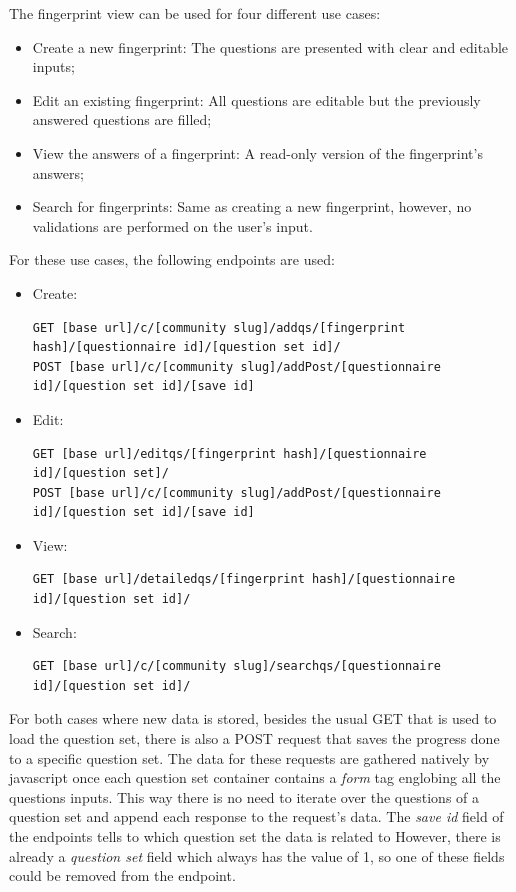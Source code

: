 The fingerprint view can be used for four different use cases:
\begin{itemize}
    \item Create a new fingerprint: The questions are presented with clear and editable inputs;
    \item Edit an existing fingerprint: All questions are editable but the previously answered questions are filled;
    \item View the answers of a fingerprint: A read-only version of the fingerprint's answers;
    \item Search for fingerprints: Same as creating a new fingerprint, however, no validations are performed on the user's input.
\end{itemize}

For these use cases, the following endpoints are used:

\begin{itemize}
    \item Create:
\begin{lstlisting}[basicstyle=\tiny]
GET [base url]/c/[community slug]/addqs/[fingerprint hash]/[questionnaire id]/[question set id]/
POST [base url]/c/[community slug]/addPost/[questionnaire id]/[question set id]/[save id]
\end{lstlisting}
    \item Edit:
\begin{lstlisting}[basicstyle=\tiny]
GET [base url]/editqs/[fingerprint hash]/[questionnaire id]/[question set]/
POST [base url]/c/[community slug]/addPost/[questionnaire id]/[question set id]/[save id]
\end{lstlisting}
    \item View:
\begin{lstlisting}[basicstyle=\tiny]
GET [base url]/detailedqs/[fingerprint hash]/[questionnaire id]/[question set id]/
\end{lstlisting}
    \item Search:
\begin{lstlisting}[basicstyle=\tiny]
GET [base url]/c/[community slug]/searchqs/[questionnaire id]/[question set id]/
\end{lstlisting}
\end{itemize}

For both cases where new data is stored, besides the usual GET that is used to load the question set, there is also a POST request that saves the progress done to a specific question set.
The data for these requests are gathered natively by javascript once each question set container contains a \textit{form} tag englobing all the questions inputs.
This way there is no need to iterate over the questions of a question set and append each response to the request's data.
The \textit{save id} field of the endpoints tells to which question set the data is related to
However, there is already a \textit{question set} field which always has the value of 1, so one of these fields could be removed from the endpoint.

